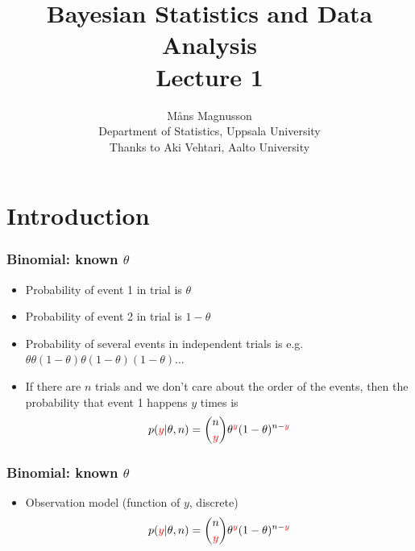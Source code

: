 \documentclass[10pt,handout]{beamer}
\title[]{{\color{black}Bayesian Statistics and Data Analysis \\ Lecture 1}}
\author[]{M{\aa}ns Magnusson \\ Department of Statistics, Uppsala University \\ Thanks to Aki Vehtari, Aalto University}
\date{}
\begin{document}
\frame{\titlepage
}



\section{Introduction}
\frame{\sectionpage}
\begin{frame}
  \frametitle{Binomial: known $\theta$}

  \begin{itemize}
  \item Probability of event 1 in trial is $\theta$
  \item<2-> Probability of event 2 in trial is $1-\theta$
  \item<3-> Probability of several events in independent trials is e.g.\\
    $\theta\theta(1-\theta)\theta(1-\theta)(1-\theta)\ldots$
  \item<4-> If there are $n$ trials and we don't care about the order
    of the events, then the probability that event 1 happens {\color{red}$y$} times
    is
    \begin{align*}
      p({\color{red}y}|\theta,n) = \binom{n}{{\color{red}y}} \theta^{\color{red}y}(1-\theta)^{n-{\color{red}y}}
    \end{align*}
  \end{itemize}

\end{frame}

\begin{frame}
  \frametitle{Binomial: known $\theta$}

  \begin{itemize}
  \item {\color{blue}Observation model} (function of {\color{red} $y$}, discrete)
    \begin{align*}
      p({\color{red}y}|\theta,n) = \binom{n}{{\color{red}y}} \theta^{\color{red}y}(1-\theta)^{n-{\color{red}y}}
    \end{align*}
  \end{itemize}

  \begin{center}
  \end{center}
\end{frame}
\end{document}
